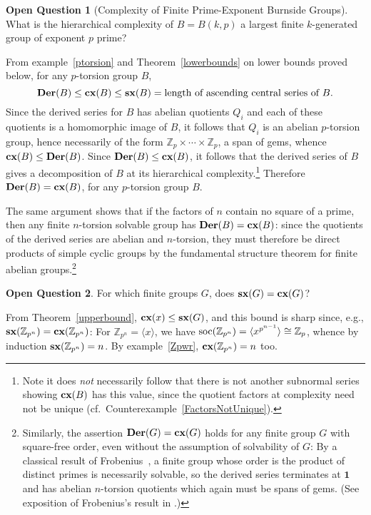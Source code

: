 \documentclass[a4paper,11pt]{amsart}
\theoremstyle{definition}
\newtheorem{open}{Open Question}
\newcommand{\cx}{\mbox{\bf cx}}
\newcommand{\sx}{{\bf sx}}
\newcommand{\Der}{{\bf Der}}
\newcommand{\soc}{\mbox{\rm soc}}
\newcommand{\Z}{\mathbb{Z}}
\newcommand{\1}{{\mathbf 1}}
\begin{document}
\begin{open}[Complexity of Finite Prime-Exponent Burnside Groups]
What is the hierarchical complexity of
 $B=B(k,p)$ a largest finite $k$-generated group of exponent $p$ prime?

From example~\ref{ptorsion} and  Theorem~\ref{lowerbounds} on lower bounds proved below, for any $p$-torsion group $B$, 
 $$\Der(B) \leq \cx(B) \leq \sx(B)= \mbox{length of ascending central series of $B$}.$$
 Since the derived series for $B$ has abelian quotients $Q_i$ and each of these quotients is a homomorphic image of $B$, it follows that $Q_i$ is an abelian $p$-torsion group, hence necessarily of the 
 form $\Z_p\times \cdots \times \Z_p$, a span of gems, whence $\cx(B)\leq \Der(B)$.
 Since $\Der(B) \leq \cx(B)$, it follows that the derived series of $B$ gives a decomposition of $B$ at its hierarchical complexity.\footnote{Note it does {\em not} necessarily follow that there is not another
 subnormal series showing $\cx(B)$ has this value, since the quotient factors at complexity need not be unique (cf.~Counterexample~\ref{FactorsNotUnique}). }
 Therefore $\Der(B)=\cx(B)$, for any $p$-torsion group $B$.  
 
 The same argument shows that if the factors of
 $n$ contain no square of a prime,  then any finite $n$-torsion solvable group has $\Der(B)=\cx(B)$:  since the quotients of the derived series are abelian and $n$-torsion, they must therefore be direct products of simple cyclic groups by the fundamental structure theorem for finite abelian groups.\footnote{Similarly, the assertion $\Der(G)=\cx(G)$ holds for any finite group $G$ with square-free order, even without the assumption of solvability of $G$:  By a classical result of Frobenius~\cite[Sec.~4]{Frobenius1893}, a finite group whose order is the product of distinct primes is necessarily solvable, so the derived series terminates at $\1$ and has abelian $n$-torsion quotients which again must be spans of gems.  (See exposition  of Frobenius's result in \cite{Ganev2010}.)}
\end{open}
\begin{open}
For which finite groups $G$, does $\sx(G)=\cx(G)$?

From Theorem~\ref{upperbound}, $\cx(x) \leq \sx(G)$, and this bound is sharp since, e.g., $\sx(\Z_{p^n})=\cx(\Z_{p^n})$:
For  $\Z_{p^n}=\langle x \rangle$, we have $\soc(\Z_{p^n})=\langle x^{p^{n-1}} \rangle\cong \Z_p$, whence by induction $\sx(\Z_{p^n})=n$. 
By example~\ref{Zpwr}, $\cx(\Z_{p^n})=n$ too. 
\end{open}
\end{document}
